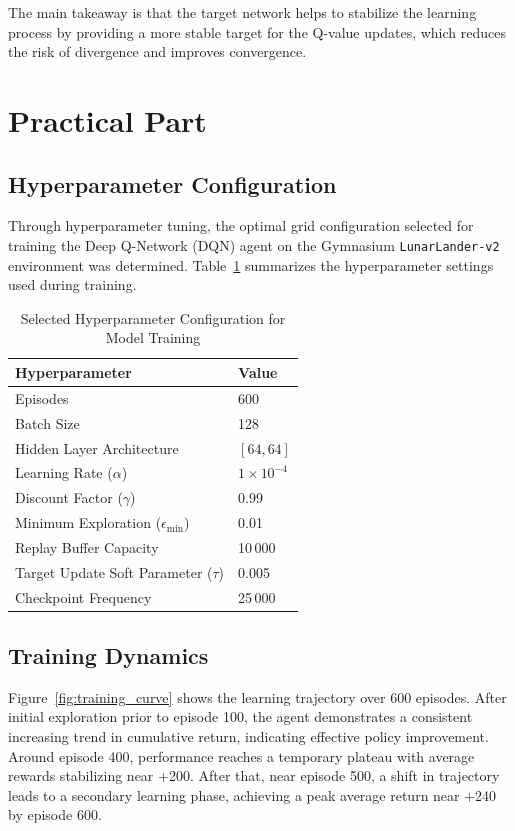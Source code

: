 \documentclass{scrartcl}
\theoremstyle{mytheoremstyle}
\theoremstyle{mytheoremstyle}
\theoremstyle{myproblemstyle}
\begin{document}
The main takeaway is that the target network helps to stabilize the learning process by providing a more stable target for the Q-value updates, which reduces the risk of divergence and improves convergence.

\section{Practical Part}

\subsection{Hyperparameter Configuration}
Through hyperparameter tuning, the optimal grid configuration selected for training the Deep Q-Network (DQN) agent on the Gymnasium \texttt{LunarLander-v2} environment was determined. Table~\ref{tab:hyperparameters} summarizes the hyperparameter settings used during training.

\begin{table}[htbp]
    \centering
    \caption{Selected Hyperparameter Configuration for Model Training}
    \label{tab:hyperparameters}
    \begin{tabular}{ll}
        \toprule
        \textbf{Hyperparameter}                 & \textbf{Value}     \\
        \midrule
        Episodes                                & 600                \\
        Batch Size                              & 128                \\
        Hidden Layer Architecture               & $[64, 64]$         \\
        Learning Rate ($\alpha$)                & $1 \times 10^{-4}$ \\
        Discount Factor ($\gamma$)              & 0.99               \\
        Minimum Exploration ($\epsilon_{\min}$) & 0.01               \\
        Replay Buffer Capacity                  & 10\,000            \\
        Target Update Soft Parameter ($\tau$)   & 0.005              \\
        Checkpoint Frequency                    & 25\,000            \\
        \bottomrule
    \end{tabular}
\end{table}

\subsection{Training Dynamics}
Figure~\ref{fig:training_curve} shows the learning trajectory over 600 episodes. After initial exploration prior to episode 100, the agent demonstrates a consistent increasing trend in cumulative return, indicating effective policy improvement. Around episode 400, performance reaches a temporary plateau with average rewards stabilizing near +200. After that, near episode 500, a shift in trajectory leads to a secondary learning phase, achieving a peak average return near +240 by episode 600.
\end{document}

